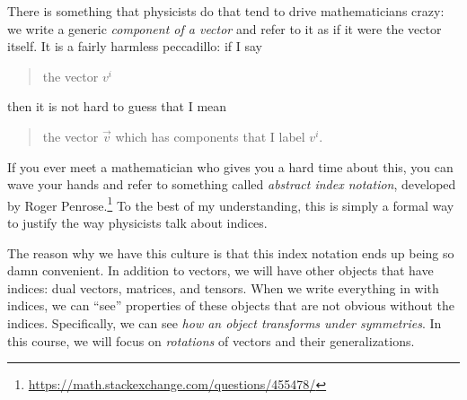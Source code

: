 \documentclass[12pt, oneside]{report}    %
\begin{document}
There is something that physicists do that tend to drive mathematicians crazy: we write a generic \emph{component of a vector} and refer to it as if it were the vector itself. It is a fairly harmless peccadillo: if I say
\begin{quote}
the vector $v^i$
\end{quote}
then it is not hard to guess that I mean
\begin{quote}
the vector $\vec{v}$ which has components that I label $v^i$.
\end{quote}
If you ever meet a mathematician who gives you a hard time about this, you can wave your hands and refer to something called \emph{abstract index notation}, developed by Roger Penrose.\footnote{\url{https://math.stackexchange.com/questions/455478/}} To the best of my understanding, this is simply a formal way to justify the way physicists talk about indices. 

The reason why we have this culture is that this index notation ends up being so damn convenient. In addition to vectors, we will have other objects that have indices: dual vectors, matrices, and tensors. When we write everything in with indices, we can ``see'' properties of these objects that are not obvious without the indices. Specifically, we can see \emph{how an object transforms under symmetries}. In this course, we will focus on \emph{rotations} of vectors and their generalizations. 
\end{document}
